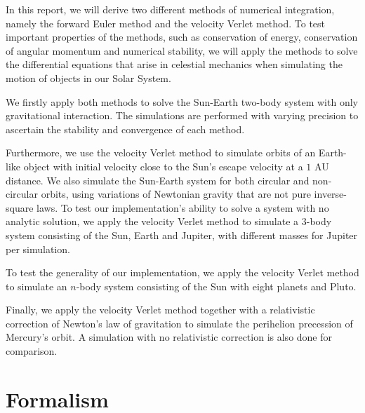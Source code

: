 \documentclass[reprint,english,notitlepage]{revtex4-1}  %
\begin{document}
In this report, we will derive two different methods of numerical integration, namely the forward Euler method and the velocity Verlet method. To test important properties of the methods, such as conservation of energy, conservation of angular momentum and numerical stability, we will apply the methods to solve the differential equations that arise in celestial mechanics when simulating the motion of objects in our Solar System.

We firstly apply both methods to solve the Sun-Earth two-body system with only gravitational interaction. The simulations are performed with varying precision to ascertain the stability and convergence of each method.

Furthermore, we use the velocity Verlet method to simulate orbits of an Earth-like object with initial velocity close to the Sun’s escape velocity at a \(1\) AU distance. We also simulate the Sun-Earth system for both circular and non-circular orbits, using variations of Newtonian gravity that are not pure inverse-square laws. To test our implementation's ability to solve a system with no analytic solution, we apply the velocity Verlet method to simulate a \(3\)-body system consisting of the Sun, Earth and Jupiter, with different masses for Jupiter per simulation.

To test the generality of our implementation, we apply the velocity Verlet method to simulate an \(n\)-body system consisting of the Sun with eight planets and Pluto.

Finally, we apply the velocity Verlet method together with a relativistic correction of Newton's law of gravitation to simulate the perihelion precession of Mercury's orbit. A simulation with no relativistic correction is also done for comparison.

\section{Formalism} \label{sec:II}
\end{document}
